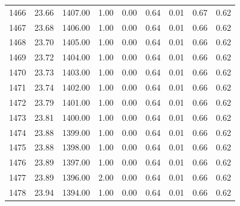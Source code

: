 \documentclass{article}\usepackage[]{graphicx}\usepackage[]{color}
\begin{document}
\begin{longtable}{rrrrrrrrr}
  1466 & 23.66 & 1407.00 & 1.00 & 0.00 & 0.64 & 0.01 & 0.67 & 0.62 \\ 
  1467 & 23.68 & 1406.00 & 1.00 & 0.00 & 0.64 & 0.01 & 0.66 & 0.62 \\ 
  1468 & 23.70 & 1405.00 & 1.00 & 0.00 & 0.64 & 0.01 & 0.66 & 0.62 \\ 
  1469 & 23.72 & 1404.00 & 1.00 & 0.00 & 0.64 & 0.01 & 0.66 & 0.62 \\ 
  1470 & 23.73 & 1403.00 & 1.00 & 0.00 & 0.64 & 0.01 & 0.66 & 0.62 \\ 
  1471 & 23.74 & 1402.00 & 1.00 & 0.00 & 0.64 & 0.01 & 0.66 & 0.62 \\ 
  1472 & 23.79 & 1401.00 & 1.00 & 0.00 & 0.64 & 0.01 & 0.66 & 0.62 \\ 
  1473 & 23.81 & 1400.00 & 1.00 & 0.00 & 0.64 & 0.01 & 0.66 & 0.62 \\ 
  1474 & 23.88 & 1399.00 & 1.00 & 0.00 & 0.64 & 0.01 & 0.66 & 0.62 \\ 
  1475 & 23.88 & 1398.00 & 1.00 & 0.00 & 0.64 & 0.01 & 0.66 & 0.62 \\ 
  1476 & 23.89 & 1397.00 & 1.00 & 0.00 & 0.64 & 0.01 & 0.66 & 0.62 \\ 
  1477 & 23.89 & 1396.00 & 2.00 & 0.00 & 0.64 & 0.01 & 0.66 & 0.62 \\ 
  1478 & 23.94 & 1394.00 & 1.00 & 0.00 & 0.64 & 0.01 & 0.66 & 0.62 \\ 
   \hline
\hline
\end{longtable}
\end{document}
